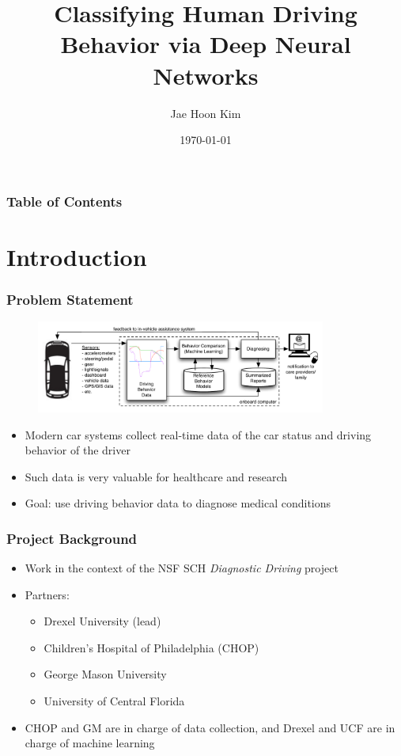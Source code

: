 \documentclass{beamer}
\title{Classifying Human Driving Behavior via Deep Neural Networks}
\author{Jae Hoon Kim}
\institute{Drexel University}
\date{\today}
\begin{document}
\frame{\titlepage}


\begin{frame}
\frametitle{Table of Contents}
\tableofcontents
\end{frame}

\section{Introduction}
\begin{frame}
\frametitle{Problem Statement}
\begin{figure}[t!]
    \centering
    \includegraphics[width=0.85\textwidth]{./pictures/figures/project-overall.pdf}
    \label{fig:diagnosticdriving}
\end{figure}
\begin{itemize}
\item Modern car systems collect real-time data of the car status and driving behavior of the driver
\item Such data is very valuable for healthcare and research
\item {\color{blue} Goal}: use driving behavior data to diagnose medical conditions
\end{itemize}
\end{frame}

\begin{frame}
\frametitle{Project Background}
\begin{itemize}
\item Work in the context of the NSF SCH {\em Diagnostic Driving} project
\item Partners:
	\begin{itemize}
	\item Drexel University (lead)
	\item Children's Hospital of Philadelphia (CHOP)
	\item George Mason University
	\item University of Central Florida
	\end{itemize}
\item CHOP and GM are in charge of data collection, and Drexel and UCF are in charge of machine learning
\end{itemize}
\end{frame}
\end{document}
